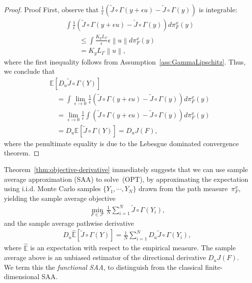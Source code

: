 \documentclass[11pt,leqno]{amsart}
\begin{document}
\begin{proof}{Proof}
    First, observe that $\frac{1}{\epsilon} \left(\tilde{J}\circ\Gamma(y + \epsilon u) - \tilde{J}\circ\Gamma(y)\right)$ is integrable:
\begin{align*}
    &\int \frac{1}{\epsilon} \left(\tilde{J}\circ\Gamma(y + \epsilon u) - \tilde{J}\circ\Gamma(y)\right) d\pi_F^x(y)
    \\
    &\qquad\leq\int \frac{K_y L_{\Gamma}}{\epsilon} \epsilon\left\|u\right\| d\pi_F^x(y)\\
    &\qquad=K_y L_{\Gamma}\left\| u\right\|,
\end{align*}
where the first inequality follows from Assumption~\ref{ass:GammaLipschitz}. Thus, we conclude that
\begin{align*}
    &\mathbb E[D_u\tilde{J}\circ\Gamma(Y)]\\
   &\quad=\int \lim_{\epsilon\rightarrow 0} \frac{1}{\epsilon} \left(\tilde{J}\circ\Gamma(y + \epsilon u) - \tilde{J}\circ\Gamma(y)\right) d\pi_F^x(y)\\
   &\quad= \lim_{\epsilon\rightarrow 0} \frac{1}{\epsilon}\int\left(\tilde{J}\circ\Gamma(y + \epsilon u) - \tilde{J}\circ\Gamma(y)\right) d\pi_F^x(y)\\
   &\quad=D_u\mathbb E[\tilde{J}\circ\Gamma(Y)] = D_u J(F),
\end{align*}
where the penultimate equality is due to the Lebesgue dominated convergence theorem.
\end{proof}

Theorem~\ref{thm:objective-derivative} immediately suggests that we can use sample average approximation (SAA) to solve~(OPT), by approximating the expectation using i.i.d. Monte Carlo samples $\{Y_1,\cdots,Y_N\}$ drawn from the path measure~$\pi_F^x$, yielding the sample average objective
 \begin{align}\tag{MC-OPT}
     \min_{F \in\mathcal{F}} \frac{1}{N}\sum_{i=1}^N \tilde J \circ \Gamma (Y_i),
 \end{align}
and the sample average pathwise derivative
\begin{align*}
    {D}_u \hat{\mathbb E}[\tilde{J}\circ\Gamma(Y)] = \frac{1}{N}\sum_{i=1}^N D_u\tilde{J}\circ\Gamma(Y_i),
\end{align*}
 where $\hat{\mathbb E}$ is an expectation with respect to the empirical measure. The sample average above is an unbiased estimator of the directional derivative $D_u J(F)$. 
 We term this the {\it functional SAA}, to distinguish from the classical finite-dimensional SAA. 
\end{document}

